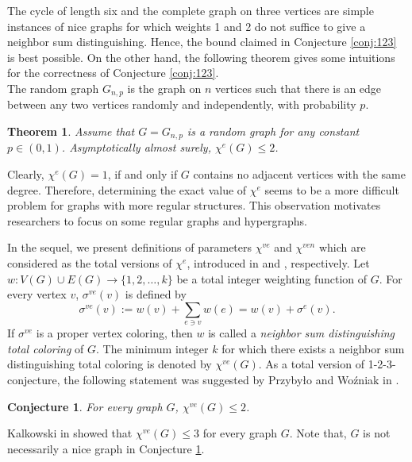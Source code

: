 \documentclass[12pt,a4paper]{article}
\newtheorem{theorem}{\bf Theorem}[section]
\newtheorem{conjecture}{\bf Conjecture}
\begin{document}
The cycle of length six and the complete graph on three vertices are simple instances of nice graphs for which weights 1 and 2 do not
suffice to give a neighbor sum distinguishing.
Hence, the bound claimed in Conjecture \ref{conj:123} is best possible. On the other hand, the following theorem gives  some intuitions for the correctness of Conjecture \ref{conj:123}.\\
The random graph $G_{n, p}$ is the graph on $n$ vertices such that there is an edge between any two vertices   randomly and independently, with
probability $p$.
\begin{theorem}{\em\cite{A1}}\label{a.all}
	Assume that $G=G_{n,p}$ is a random graph for any constant $p \in (0,1)$.
	Asymptotically almost surely, $  \chi^{e}(G) \leq 2$.
\end{theorem}
Clearly, $ \chi^{e}(G) =1$, if and only if $G$ contains no adjacent vertices with the same degree. Therefore,
determining the exact value of $  \chi^{e}$ seems to be a more difficult problem  for graphs with more regular structures. This observation  motivates researchers  to focus on some regular graphs and hypergraphs.

In the sequel, we present  definitions of  parameters $ \chi^{ve}$ and $ \chi^{ven}$ which are considered as the total versions of $ \chi^{e} $, introduced  in \cite{PW} and \cite{B}, respectively.
Let $w:V(G)\cup E(G)\rightarrow\{1,2,\ldots, k\} $ be a total integer weighting function of $G$. For every vertex $v$, $ \sigma^{ve}(v) $ is defined by
\begin{equation*}
\sigma^{ve}(v) :=w(v)+ \sum_{e\ni v}w(e)= w(v)+\sigma^{e}(v).
\end{equation*}
If $ \sigma^{ve}$ is a proper vertex coloring, then  $w$ is called  a \textit{neighbor sum distinguishing total coloring} of $G$. The minimum integer $k$ for which there exists a neighbor
sum distinguishing total coloring is denoted by $ \chi^{ve}(G) $.
As a total version of 1-2-3-conjecture, the following statement was suggested by Przyby\l o and Wo\'{z}niak in \cite{PW}.

\begin{conjecture}\label{ve conj}{\em\cite{PW}}
	For every  graph $ G $, $  \chi^{ve}(G)\leq 2 $.
\end{conjecture}

Kalkowski in \cite{K} showed that $  \chi^{ve}(G)\leq 3 $ for every graph $G$. Note that, $ G $ is not necessarily a nice graph in Conjecture \ref{ve conj}.
\end{document}
